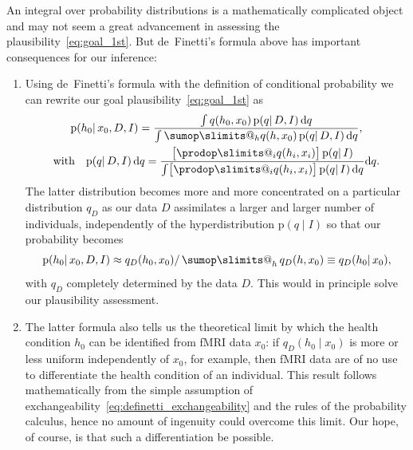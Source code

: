 \documentclass[\ifafour a4paper,12pt,\else a5paper,10pt,\fi%
onecolumn,oneside,article,%
british%
]{memoir}
\makeatletter
\theoremstyle{remark}
\theoremstyle{innote}
\def\sum{\DOTSI\sumop\slimits@}
\def\prod{\DOTSI\prodop\slimits@}
\newcommand*{\di}{\mathrm{d}}%
\newcommand*{\pf}{\mathrm{p}}%
\renewcommand*{\|}{\mathpunct{|}}
\newcommand*{\tsum}{\mathop{\textstyle\sum}\nolimits}
\newcommand*{\yH}{h}
\newcommand*{\yD}{D}
\newcommand*{\yx}{x}
\newcommand*{\yp}{q}
\newcommand*{\ypc}{\yp_{\yD}}
\newcommand*{\yI}{I}
\theoremstyle{plain}
\makeatother
\begin{document}
An integral over probability distributions is a mathematically complicated
object and may not seem a great advancement in assessing the
plausibility~\eqref{eq:goal_1st}. But de~Finetti's formula above has
important consequences for our inference:
\begin{enumerate}[wide]
\item Using de~Finetti's formula with the definition of conditional
  probability we can rewrite our goal plausibility~\eqref{eq:goal_1st} as
\begin{equation}\label{eq:goal_1st_exchangeability}
\begin{gathered}
    \pf(\yH_0 \| \yx_0, \yD, \yI) =
    \frac{
      \int \yp(\yH_0,\yx_0)\,
      \pf(\yp \|\yD,\yI) \,\di\yp
    }{
      \int \sum_{\yH}\yp(\yH,\yx_0)\,
      \pf(\yp \|\yD,\yI) \,\di\yp },
    \\ \text{with} \quad \pf(\yp \|\yD,\yI) \,\di\yp =
    \frac{ \bigl[ \prod_i \yp(\yH_i,\yx_i) \bigr]\,
      \pf(\yp \|\yI)
    }{
      \int \bigl[ \prod_i \yp(\yH_i,\yx_i) \bigr]\,
      \pf(\yp \|\yI) \,\di\yp }\di\yp.
\end{gathered}
\end{equation}
The latter distribution becomes more and more concentrated on a particular
distribution $\ypc$ as our data $\yD$ assimilates a larger and larger number
of individuals, independently of the hyperdistribution $\pf(\yp \|\yI)$ so
that our probability becomes
\begin{equation}
  \label{eq:goal_1st_limit}
  \pf(\yH_0 \| \yx_0, \yD, \yI) \approx
  \ypc(\yH_0,\yx_0) / \tsum_{\yH}\ypc(\yH,\yx_0)
  \equiv \ypc(\yH_0\|\yx_0),
\end{equation}
with $\ypc$ completely determined by the data $\yD$. This would in
principle solve our plausibility assessment.
\item The latter formula also tells us the theoretical limit by which the
  health condition $\yH_0$ can be identified from fMRI data $\yx_0$: if
  $\ypc(\yH_0\|\yx_0)$ is more or less uniform independently of $\yx_0$,
  for example, then fMRI data are of no use to differentiate the
  health condition of an individual. This result follows mathematically
  from the simple assumption of
  exchangeability~\eqref{eq:definetti_exchangeability} and the rules of the
  probability calculus, hence no amount of ingenuity could overcome this
  limit. Our hope, of course, is that such a differentiation be possible.
\end{enumerate}

\medskip
\end{document}
